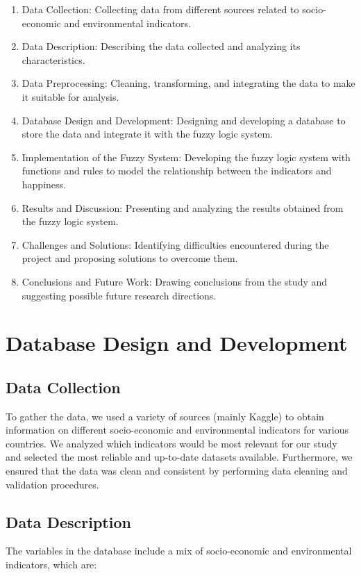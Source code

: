 \documentclass[fleqn,11pt]{article}
\begin{document}
\begin{enumerate}
	\item Data Collection: Collecting data from different sources related to socio-economic and environmental indicators.
	\item Data Description: Describing the data collected and analyzing its characteristics.
	\item Data Preprocessing: Cleaning, transforming, and integrating the data to make it suitable for analysis.
	\item Database Design and Development: Designing and developing a database to store the data and integrate it with the fuzzy logic system.
	\item Implementation of the Fuzzy System: Developing the fuzzy logic system with functions and rules to model the relationship between the indicators and happiness.
	\item Results and Discussion: Presenting and analyzing the results obtained from the fuzzy logic system.
	\item Challenges and Solutions: Identifying difficulties encountered during the project and proposing solutions to overcome them.
	\item Conclusions and Future Work: Drawing conclusions from the study and suggesting possible future research directions.
\end{enumerate}



\section{Database Design and Development}

\subsection{Data Collection}
To gather the data, we used a variety of sources (mainly Kaggle) to obtain information on different socio-economic and environmental indicators for various countries.
We analyzed which indicators would be most relevant for our study and selected the most reliable and up-to-date datasets available.
Furthermore, we ensured that the data was clean and consistent by performing data cleaning and validation procedures.

\subsection{Data Description}
The variables in the database include a mix of socio-economic and environmental indicators, which are:
\end{document}
